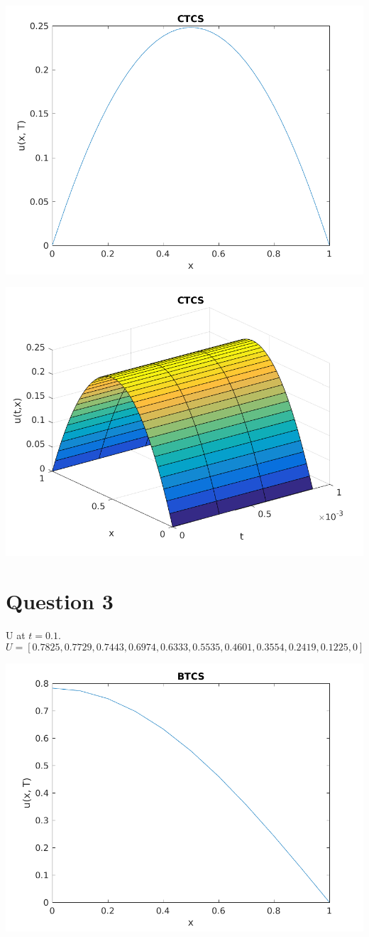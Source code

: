 \documentclass{article}
\begin{document}
\includegraphics{"q2_11"}
\pagebreak

\includegraphics{"q2_12"}
\pagebreak

\section{Question 3}

U at $t = 0.1$. \[U = [0.7825, 0.7729, 0.7443, 0.6974, 0.6333, 0.5535, 0.4601, 0.3554, 0.2419, 0.1225, 0]\]

\includegraphics{"q3_1"}
\pagebreak
\end{document}
